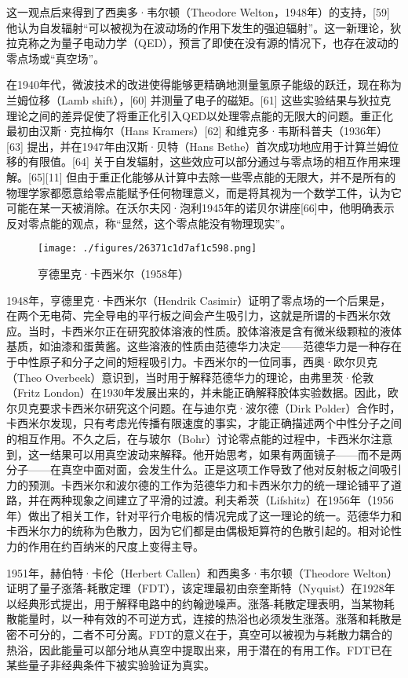 这一观点后来得到了西奥多·韦尔顿（Theodore Welton，1948年）的支持，[59] 他认为自发辐射“可以被视为在波动场的作用下发生的强迫辐射”。这一新理论，狄拉克称之为量子电动力学（QED），预言了即使在没有源的情况下，也存在波动的零点场或“真空场”。

在1940年代，微波技术的改进使得能够更精确地测量氢原子能级的跃迁，现在称为兰姆位移（Lamb shift），[60] 并测量了电子的磁矩。[61] 这些实验结果与狄拉克理论之间的差异促使了将重正化引入QED以处理零点能的无限大的问题。重正化最初由汉斯·克拉梅尔（Hans Kramers）[62] 和维克多·韦斯科普夫（1936年）[63] 提出，并在1947年由汉斯·贝特（Hans Bethe）首次成功地应用于计算兰姆位移的有限值。[64] 关于自发辐射，这些效应可以部分通过与零点场的相互作用来理解。[65][11] 但由于重正化能够从计算中去除一些零点能的无限大，并不是所有的物理学家都愿意给零点能赋予任何物理意义，而是将其视为一个数学工件，认为它可能在某一天被消除。在沃尔夫冈·泡利1945年的诺贝尔讲座[66]中，他明确表示反对零点能的观点，称“显然，这个零点能没有物理现实”。
\begin{figure}[ht]
\centering
\texttt{[image: ./figures/26371c1d7af1c598.png]}
\caption{亨德里克·卡西米尔（1958年）} \label{fig_LD_9}
\end{figure}
1948年，亨德里克·卡西米尔（Hendrik Casimir）证明了零点场的一个后果是，在两个无电荷、完全导电的平行板之间会产生吸引力，这就是所谓的卡西米尔效应。当时，卡西米尔正在研究胶体溶液的性质。胶体溶液是含有微米级颗粒的液体基质，如油漆和蛋黄酱。这些溶液的性质由范德华力决定——范德华力是一种存在于中性原子和分子之间的短程吸引力。卡西米尔的一位同事，西奥·欧尔贝克（Theo Overbeek）意识到，当时用于解释范德华力的理论，由弗里茨·伦敦（Fritz London）在1930年发展出来的，并未能正确解释胶体实验数据。因此，欧尔贝克要求卡西米尔研究这个问题。在与迪尔克·波尔德（Dirk Polder）合作时，卡西米尔发现，只有考虑光传播有限速度的事实，才能正确描述两个中性分子之间的相互作用。不久之后，在与玻尔（Bohr）讨论零点能的过程中，卡西米尔注意到，这一结果可以用真空波动来解释。他开始思考，如果有两面镜子——而不是两分子——在真空中面对面，会发生什么。正是这项工作导致了他对反射板之间吸引力的预测。卡西米尔和波尔德的工作为范德华力和卡西米尔力的统一理论铺平了道路，并在两种现象之间建立了平滑的过渡。利夫希茨（Lifshitz）在1956年（1956年）做出了相关工作，针对平行介电板的情况完成了这一理论的统一。范德华力和卡西米尔力的统称为色散力，因为它们都是由偶极矩算符的色散引起的。相对论性力的作用在约百纳米的尺度上变得主导。

1951年，赫伯特·卡伦（Herbert Callen）和西奥多·韦尔顿（Theodore Welton）证明了量子涨落-耗散定理（FDT），该定理最初由奈奎斯特（Nyquist）在1928年以经典形式提出，用于解释电路中的约翰逊噪声。涨落-耗散定理表明，当某物耗散能量时，以一种有效的不可逆方式，连接的热浴也必须发生涨落。涨落和耗散是密不可分的，二者不可分离。FDT的意义在于，真空可以被视为与耗散力耦合的热浴，因此能量可以部分地从真空中提取出来，用于潜在的有用工作。FDT已在某些量子非经典条件下被实验验证为真实。

